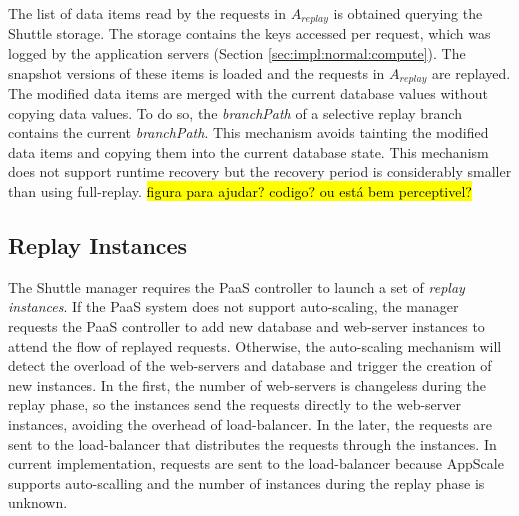 The list of data items read by the requests in $A_{replay}$ is obtained querying the Shuttle storage. The storage contains the keys accessed per request, which was logged by the application servers (Section \ref{sec:impl:normal:compute}). The snapshot versions of these items is loaded and the requests in $A_{replay}$ are replayed. The modified data items are merged with the current database values without copying data values. To do so, the \emph{branchPath} of a selective replay branch contains the current \emph{branchPath}. This mechanism avoids tainting the modified data items and copying them into the current database state. This mechanism does not support runtime recovery but the recovery period is considerably smaller than using full-replay. \hl{figura para ajudar? codigo? ou está bem perceptivel?} \\



\subsection{Replay Instances}\label{sec:impl:recovery:replay}
The Shuttle manager requires the \ac{PaaS} controller to launch a set of \textit{replay instances}. If the \ac{PaaS} system does not support auto-scaling, the manager requests the \ac{PaaS} controller to add new database and web-server instances to attend the flow of replayed requests. Otherwise, the auto-scaling mechanism will detect the overload of the web-servers and database and trigger the creation of new instances. In the first, the number of web-servers is changeless during the replay phase, so the instances send the requests directly to the web-server instances, avoiding the overhead of load-balancer. In the later, the requests are sent to the load-balancer that distributes the requests through the instances. In current implementation, requests are sent to the load-balancer because AppScale supports auto-scalling and the number of instances during the replay phase is unknown.\\

